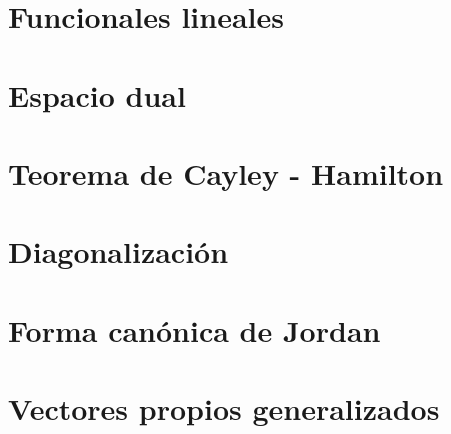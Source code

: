 
\section{Funcionales lineales}


\section{Espacio dual}


\section{Teorema de Cayley - Hamilton}


\section{Diagonalización}


\section{Forma canónica de Jordan}


\section{Vectores propios generalizados}